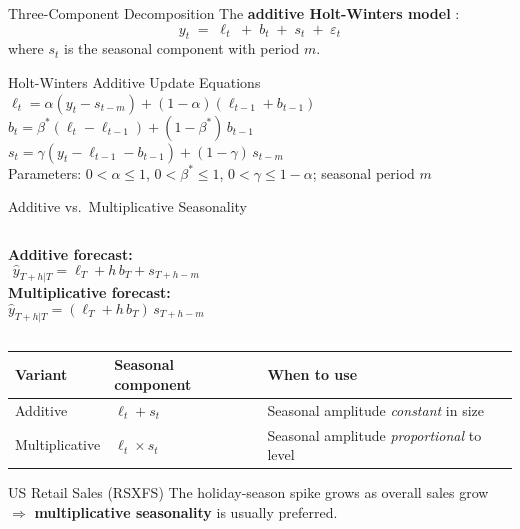 \documentclass[aspectratio=169, 11pt]{beamer}
\begin{document}

\begin{frame}{Three-Component Decomposition}
  The \textbf{additive Holt-Winters model} \parencite{Winters1960}:
  \[
    y_t \;=\; \ell_t \;+\; b_t \;+\; s_t \;+\; \varepsilon_t
  \]
  where $s_t$ is the seasonal component with period $m$.
  \begin{definitionbox}{Holt-Winters Additive Update Equations}
    {\small
    $\ell_t = \alpha(y_t - s_{t-m}) + (1-\alpha)(\ell_{t-1}+b_{t-1})$\\[3pt]
    $b_t = \beta^*(\ell_t - \ell_{t-1}) + (1-\beta^*)\,b_{t-1}$\\[3pt]
    $s_t = \gamma(y_t - \ell_{t-1} - b_{t-1}) + (1-\gamma)\,s_{t-m}$\\[3pt]
    Parameters: $0 < \alpha \leq 1$, $0 < \beta^* \leq 1$,
    $0 < \gamma \leq 1{-}\alpha$; seasonal period $m$
    }
  \end{definitionbox}
\end{frame}

\begin{frame}{Additive vs.\ Multiplicative Seasonality}
  \begin{columns}[T]
      \textbf{Additive forecast:}
      \[
        \hat{y}_{T+h|T} = \ell_T + h\,b_T + s_{T+h-m}
      \]
      \textbf{Multiplicative forecast:}
      \[
        \hat{y}_{T+h|T} = (\ell_T + h\,b_T)\,s_{T+h-m}
      \]
  \end{columns}
  \begin{center}
    {\small
    \begin{tabular}{lll}
      \toprule
      \textbf{Variant} & \textbf{Seasonal component} & \textbf{When to use} \\
      \midrule
      Additive  & $\ell_t + s_t$ & Seasonal amplitude \emph{constant} in size \\
      Multiplicative & $\ell_t \times s_t$ & Seasonal amplitude \emph{proportional} to level \\
      \bottomrule
    \end{tabular}
    }
  \end{center}
  \begin{examplebox}{US Retail Sales (RSXFS)}
    {\small The holiday-season spike grows as overall sales grow
    $\Rightarrow$ \textbf{multiplicative seasonality} is usually preferred.}
  \end{examplebox}
\end{frame}
\end{document}
